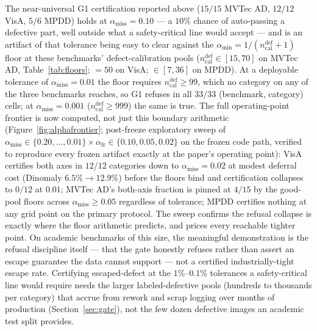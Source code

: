 \documentclass[preprint,11pt]{elsarticle}
\begin{document}
The near-universal G1 certification reported above ($15/15$ MVTec AD, $12/12$ VisA, $5/6$ MPDD)
holds at $\alpha_{\text{miss}}=0.10$ --- a $10\%$ chance of auto-passing a defective part, well
outside what a safety-critical line would accept --- and is an artifact of that tolerance being
easy to clear against the $\alpha_{\min}=1/(n_{\text{cal}}^{\text{def}}+1)$ floor at these
benchmarks' defect-calibration pools ($n_{\text{cal}}^{\text{def}}\in[15,70]$ on MVTec AD,
Table~\ref{tab:floors}; $=50$ on VisA; $\in[7,36]$ on MPDD). At a deployable tolerance of
$\alpha_{\text{miss}}=0.01$ the floor requires $n_{\text{cal}}^{\text{def}}\ge 99$, which no
category on any of the three benchmarks reaches, so G1 refuses in all $33/33$ (benchmark,
category) cells; at $\alpha_{\text{miss}}=0.001$ ($n_{\text{cal}}^{\text{def}}\ge 999$) the same
is true. The full operating-point frontier is now computed, not just this boundary arithmetic
(Figure~\ref{fig:alphafrontier}; post-freeze exploratory sweep of
$\alpha_{\text{miss}}\in\{0.20,\dots,0.01\}\times\alpha_{\text{fr}}\in\{0.10,0.05,0.02\}$ on the
frozen code path, verified to reproduce every frozen artifact exactly at the paper's operating
point): VisA certifies both axes in $12/12$ categories down to $\alpha_{\text{miss}}=0.02$ at
modest deferral cost (Dinomaly $6.5\%\!\to\!12.9\%$) before the floors bind and certification
collapses to $0/12$ at $0.01$; MVTec AD's both-axis fraction is pinned at $4/15$ by the
good-pool floors across $\alpha_{\text{miss}}\ge 0.05$ regardless of tolerance; MPDD certifies
nothing at any grid point on the primary protocol. The sweep confirms the refusal collapse is
exactly where the floor arithmetic predicts, and prices every reachable tighter point. On
academic benchmarks of this size, the meaningful demonstration is the refusal discipline itself
--- that the gate honestly refuses rather than assert an escape guarantee the data cannot support
--- not a certified industrially-tight escape rate. Certifying escaped-defect at the
$1\%$--$0.1\%$ tolerances a safety-critical line would require needs the larger
labeled-defective pools (hundreds to thousands per category) that accrue from rework and scrap
logging over months of production (Section~\ref{sec:gate}), not the few dozen defective images an
academic test split provides.

\FloatBarrier
\end{document}
